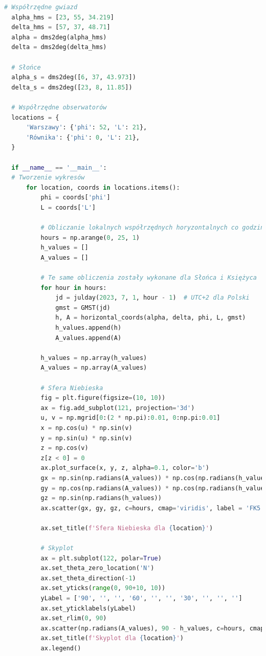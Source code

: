 \documentclass[fleqn,10pt,a4paper]{article}
\begin{document}
\begin{lstlisting}[language=Python, caption=Implementacja wykresów położenia gwiazdy FK5 899, label = kod3]
  # Współrzędne gwiazd
  alpha_hms = [23, 55, 34.219]
  delta_hms = [57, 37, 48.71]
  alpha = dms2deg(alpha_hms)
  delta = dms2deg(delta_hms)
  
  # Słońce
  alpha_s = dms2deg([6, 37, 43.973])
  delta_s = dms2deg([23, 8, 11.85])
  
  # Współrzędne obserwatorów
  locations = {
      'Warszawy': {'phi': 52, 'L': 21},
      'Równika': {'phi': 0, 'L': 21},
  }
  
  if __name__ == '__main__':
  # Tworzenie wykresów
      for location, coords in locations.items():
          phi = coords['phi']
          L = coords['L']
  
          # Obliczanie lokalnych współrzędnych horyzontalnych co godzinę
          hours = np.arange(0, 25, 1)
          h_values = []
          A_values = []

          # Te same obliczenia zostały wykonane dla Słońca i Księżyca
          for hour in hours:
              jd = julday(2023, 7, 1, hour - 1)  # UTC+2 dla Polski
              gmst = GMST(jd)
              h, A = horizontal_coords(alpha, delta, phi, L, gmst)
              h_values.append(h)
              A_values.append(A)

          h_values = np.array(h_values)
          A_values = np.array(A_values)

          # Sfera Niebieska
          fig = plt.figure(figsize=(10, 10))
          ax = fig.add_subplot(121, projection='3d')
          u, v = np.mgrid[0:(2 * np.pi):0.01, 0:np.pi:0.01]
          x = np.cos(u) * np.sin(v)
          y = np.sin(u) * np.sin(v)
          z = np.cos(v)
          z[z < 0] = 0
          ax.plot_surface(x, y, z, alpha=0.1, color='b')
          gx = np.sin(np.radians(A_values)) * np.cos(np.radians(h_values))
          gy = np.cos(np.radians(A_values)) * np.cos(np.radians(h_values))
          gz = np.sin(np.radians(h_values))
          ax.scatter(gx, gy, gz, c=hours, cmap='viridis', label = 'FK5 899')
  
          ax.set_title(f'Sfera Niebieska dla {location}')
  
          # Skyplot
          ax = plt.subplot(122, polar=True)
          ax.set_theta_zero_location('N')
          ax.set_theta_direction(-1)
          ax.set_yticks(range(0, 90+10, 10))
          yLabel = ['90', '', '', '60', '', '', '30', '', '', '']
          ax.set_yticklabels(yLabel)
          ax.set_rlim(0, 90)
          ax.scatter(np.radians(A_values), 90 - h_values, c=hours, cmap='viridis', label = 'FK5 899')
          ax.set_title(f'Skyplot dla {location}')
          ax.legend()
  

\end{lstlisting}
\end{document}
